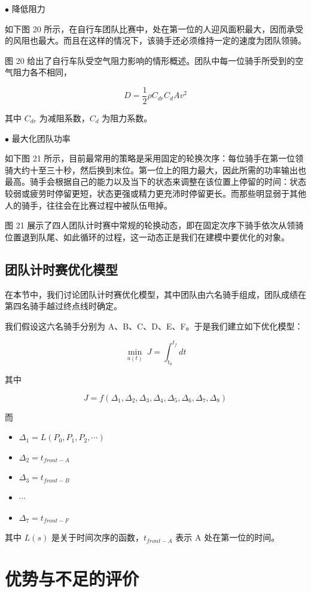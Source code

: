 \documentclass[11pt,a4paper]{ctexart}
\begin{document}
$\bullet$ 降低阻力

如下图 20 所示，在自行车团队比赛中，处在第一位的人迎风面积最大，因而承受的风阻也最大。而且在这样的情况下，该骑手还必须维持一定的速度为团队领骑。

图 20 给出了自行车队受空气阻力影响的情形概述。团队中每一位骑手所受到的空气阻力各不相同，

\[
D=\frac{1}{2}\rho C_{dr}C_dAv^{2}
\]

其中 $C_{dr}$ 为减阻系数，$C_d$ 为阻力系数。

$\bullet$ 最大化团队功率

如下图 21 所示，目前最常用的策略是采用固定的轮换次序：每位骑手在第一位领骑大约十至三十秒，然后换到末位。第一位上的阻力最大，因此所需的功率输出也最高。骑手会根据自己的能力以及当下的状态来调整在该位置上停留的时间：状态较弱或疲劳时停留更短，状态更强或精力更充沛时停留更长。而那些明显弱于其他人的骑手，往往会在比赛过程中被队伍甩掉。

图 21 展示了四人团队计时赛中常规的轮换动态，即在固定次序下骑手依次从领骑位置退到队尾、如此循环的过程，这一动态正是我们在建模中要优化的对象。

\subsection{团队计时赛优化模型}

在本节中，我们讨论团队计时赛优化模型，其中团队由六名骑手组成，团队成绩在第四名骑手越过终点线时确定。

我们假设这六名骑手分别为 A、B、C、D、E、F。于是我们建立如下优化模型：

\[
\min_{u(t)}\ J=\int_{t_0}^{t_f} dt
\]

其中

\[
J=f\left(\Delta_1,\Delta_2,\Delta_3,\Delta_4,\Delta_5,\Delta_6,\Delta_7,\Delta_8\right)
\]

而

\begin{itemize}
\item $\Delta_1=L\left(P_0,P_1,P_2,\cdots\right)$
\item $\Delta_2=t_{front-A}$
\item $\Delta_3=t_{front-B}$
\item $\cdots$
\item $\Delta_7=t_{front-F}$
\end{itemize}

其中 $L(s)$ 是关于时间次序的函数，$t_{front-A}$ 表示 A 处在第一位的时间。

\section{优势与不足的评价}
\end{document}
